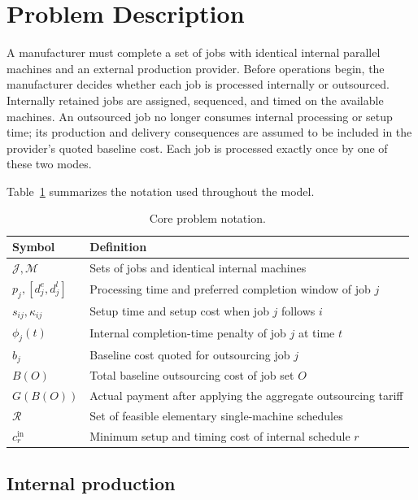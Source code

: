 \section{Problem Description}\label{sec:problem}

A manufacturer must complete a set of jobs with identical internal parallel
machines and an external production provider. Before operations begin, the
manufacturer decides whether each job is processed internally or outsourced.
Internally retained jobs are assigned, sequenced, and timed on the available
machines. An outsourced job no longer consumes internal processing or setup time;
its production and delivery consequences are assumed to be included in the
provider's quoted baseline cost. Each job is processed exactly once by one of
these two modes.

Table~\ref{tab:core-notation} summarizes the notation used throughout the model.
\begin{table}[t]
    \centering
    \caption{Core problem notation.}
    \label{tab:core-notation}
    \begin{tabularx}{\textwidth}{@{}lX@{}}
        \toprule
        Symbol & Definition \\
        \midrule
        $\mathcal J,\mathcal M$ & Sets of jobs and identical internal machines \\
        $p_j,[d_j^e,d_j^l]$ & Processing time and preferred completion window of job $j$ \\
        $s_{ij},\kappa_{ij}$ & Setup time and setup cost when job $j$ follows $i$ \\
        $\phi_j(t)$ & Internal completion-time penalty of job $j$ at time $t$ \\
        $b_j$ & Baseline cost quoted for outsourcing job $j$ \\
        $B(O)$ & Total baseline outsourcing cost of job set $O$ \\
        $G(B(O))$ & Actual payment after applying the aggregate outsourcing tariff \\
        $\mathcal R$ & Set of feasible elementary single-machine schedules \\
        $c_r^{\mathrm{in}}$ & Minimum setup and timing cost of internal schedule $r$ \\
        \bottomrule
    \end{tabularx}
\end{table}

\subsection{Internal production}

